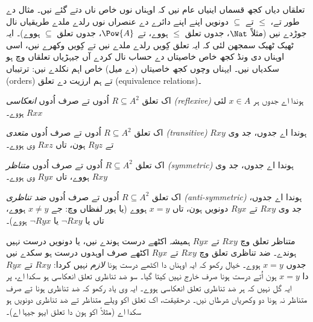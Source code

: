 \documentclass[../../../include/open-logic-section]{subfiles}
\begin{document}

\begin{intro}
تعلقاں دیاں کجھ قسماں اینیاں عام نیں کہ اوہناں نوں خاص ناں دتے گئے نیں۔
مثال دے طور تے، $\le$ تے $\subseteq$ دونویں اپنے اپنے دائرے دے عنصراں نوں
رلدے ملدے طریقیاں نال جوڑدے نیں (مثلاً $\Nat$، جدوں تعلق $\le$ ہووے،
تے $\Pow{A}$، جدوں تعلق $\subseteq$ ہووے)۔ ایہ ٹھیک ٹھیک سمجھن لئی کہ
ایہ تعلق کِویں رلدے ملدے نیں تے کِویں وکھرے نیں، اسی اوہناں دی ونڈ
کجھ خاص خاصیتاں دے حساب نال کردے آں جیہڑیاں تعلقاں وچ ہو سکدیاں نیں۔
ایہناں وچوں کجھ خاصیتاں (دے میل) خاص اہم نکلدے نیں: ترتیباں (orders) تے
ہم ارزیت دے تعلق (equivalence relations)۔
\end{intro}

\begin{defn}
اک تعلق $R \subseteq A^2$ اُدوں تے صرف اُدوں \emph{انعکاسی (reflexive)} ہوندا اے جدوں
ہر $x \in A$ لئی $Rxx$ ہووے۔
\end{defn}

\begin{defn}
اک تعلق $R \subseteq A^2$ اُدوں تے صرف اُدوں \emph{متعدی (transitive)} ہوندا اے جدوں،
جد وی $Rxy$ تے $Ryz$ ہون، تاں $Rxz$ وی ہووے۔
\end{defn}

\begin{defn}
اک تعلق $R \subseteq A^2$ اُدوں تے صرف اُدوں \emph{متناظر (symmetric)} ہوندا اے جدوں،
جد وی $Rxy$ ہووے، تاں $Ryx$ وی ہووے۔
\end{defn}

\begin{defn}
اک تعلق $R \subseteq A^2$ اُدوں تے صرف اُدوں \emph{ضد تناظری (anti-symmetric)} ہوندا اے جدوں،
جد وی $Rxy$ تے $Ryx$ دونویں ہون، تاں $x=y$ ہووے (یا ہور لفظاں وچ:
جے $x\neq y$ ہووے، تاں یا $\lnot Rxy$ یا $\lnot Ryx$ ہووے)۔
\end{defn}

\begin{explain}
متناظر تعلق وچ $Rxy$ تے $Ryx$ ہمیشہ اکٹھے درست ہوندے نیں، یا دونویں
درست نہیں ہوندے۔ ضد تناظری تعلق وچ $Rxy$ تے $Ryx$ اکٹھے صرف اوہدوں
درست ہو سکدے نیں جدوں $x = y$ ہووے۔ خیال رکھو کہ ایہ اوہناں دا
اکٹھے درست ہونا \emph{لازم} نہیں کردا: $Rxy$ تے $Ryx$ دا $x = y$ ہون اُتے
درست ہونا صرف خارج نہیں کیتا گیا۔ سو ضد تناظری تعلق انعکاسی ہو سکدا
اے، پر ایہ گل نہیں کہ ہر ضد تناظری تعلق انعکاسی ہووے۔ ایہ وی یاد رکھو
کہ ضد تناظری ہونا تے صرف متناظر نہ ہونا دو وکھریاں شرطاں نیں۔ درحقیقت،
اک تعلق اکو ویلے متناظر تے ضد تناظری دونویں ہو سکدا اے (مثلاً اکو ہون
دا تعلق ایہو جیہا اے)۔
\end{explain}
\end{document}
